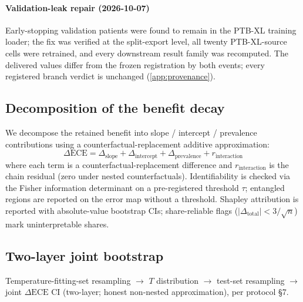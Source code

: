 \documentclass[final,5p,times,nonatbib]{elsarticle}
\begin{document}
\paragraph{Validation-leak repair (2026-10-07)} Early-stopping
validation patients were found to remain in the PTB-XL training loader;
the fix was verified at the split-export level, all twenty PTB-XL-source
cells were retrained, and every downstream result family was recomputed.
The delivered values differ from the frozen registration by both events;
every registered branch verdict is unchanged (\ref{app:provenance}).
\subsection{Decomposition of the benefit decay}
\label{sec:decomp}
We decompose the retained benefit into slope / intercept / prevalence
contributions using a counterfactual-replacement additive approximation:
\begin{equation}
    \Delta\text{ECE} = \Delta_{\text{slope}}
    + \Delta_{\text{intercept}}
    + \Delta_{\text{prevalence}}
    + r_{\text{interaction}}
\end{equation}
where each term is a counterfactual-replacement difference and
$r_{\text{interaction}}$ is the chain residual (zero under nested
counterfactuals). Identifiability is checked via the Fisher information
determinant on a pre-registered threshold $\tau$; entangled regions are
reported on the error map without a threshold. Shapley attribution is
reported with absolute-value bootstrap CIs; share-reliable flags
($|\Delta_{\text{total}}|<3/\sqrt{n}$) mark uninterpretable shares.

\subsection{Two-layer joint bootstrap}
Temperature-fitting-set resampling $\rightarrow$ $T$ distribution
$\rightarrow$ test-set resampling $\rightarrow$ joint $\Delta\text{ECE}$ CI
(two-layer; honest non-nested approximation), per protocol \S7.
\end{document}
